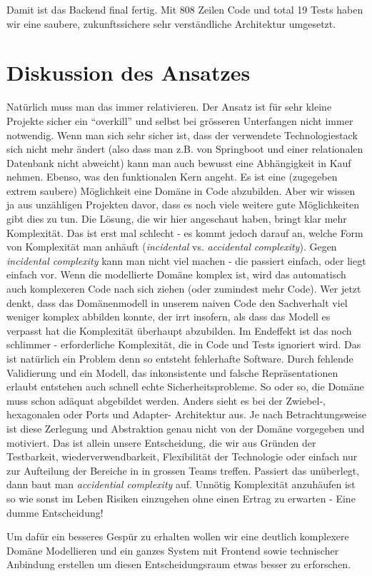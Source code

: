 Damit ist das Backend final fertig. Mit 808 Zeilen Code und total 19 
Tests haben wir eine saubere, zukunftssichere sehr verständliche 
Architektur umgesetzt.

\section{Diskussion des Ansatzes}
Natürlich muss man das immer relativieren. Der Ansatz ist für sehr kleine
Projekte sicher ein ``overkill'' und selbst bei grösseren Unterfangen nicht
immer notwendig. Wenn man sich sehr sicher ist, dass der verwendete
Technologiestack sich nicht mehr ändert (also dass man z.B. von 
Springboot und einer relationalen Datenbank nicht abweicht) kann man auch
bewusst eine Abhängigkeit in Kauf nehmen. Ebenso, was den funktionalen Kern
angeht. Es ist eine (zugegeben extrem saubere) Möglichkeit eine 
Domäne in Code abzubilden. Aber wir wissen ja aus unzähligen Projekten davor,
dass es noch viele weitere gute Möglichkeiten gibt dies zu tun. 
Die Lösung, die wir hier angeschaut haben, bringt klar mehr Komplexität. Das ist
erst mal schlecht - es kommt jedoch darauf an, welche Form von Komplexität man 
anhäuft (\textit{incidental} vs. \textit{accidental} \textit{complexity}).
Gegen \textit{incidental complexity} kann man nicht viel machen - die passiert
einfach, oder liegt einfach vor. Wenn die modellierte Domäne komplex ist, wird
das automatisch auch komplexeren Code nach sich ziehen (oder zumindest mehr 
Code). Wer jetzt denkt, dass
das Domänenmodell in unserem naiven Code den Sachverhalt viel weniger komplex 
abbilden konnte, der irrt insofern, als dass das Modell es verpasst hat die 
Komplexität überhaupt abzubilden. Im Endeffekt ist das noch schlimmer - 
erforderliche Komplexität, die in Code und Tests ignoriert wird. Das ist 
natürlich ein Problem denn so entsteht fehlerhafte Software. Durch fehlende
Validierung und ein Modell, das inkonsistente und falsche Repräsentationen
erlaubt entstehen auch schnell echte Sicherheitsprobleme. So oder so, die
Domäne muss schon adäquat abgebildet werden.
Anders sieht es bei der Zwiebel-, hexagonalen oder Ports und Adapter- 
Architektur aus. Je nach Betrachtungsweise ist diese Zerlegung und Abstraktion
genau nicht von der Domäne vorgegeben und motiviert. Das ist allein unsere
Entscheidung, die wir aus Gründen der Testbarkeit, wiederverwendbarkeit, 
Flexibilität der Technologie oder einfach nur zur Aufteilung der Bereiche in
in grossen Teams treffen. Passiert das unüberlegt, dann baut man 
\textit{accidential complexity} auf. Unnötig Komplexität anzuhäufen ist so wie
sonst im Leben Risiken einzugehen ohne einen Ertrag zu erwarten - Eine
dumme Entscheidung!

Um dafür ein besseres Gespür zu erhalten wollen wir eine deutlich
komplexere Domäne Modellieren und ein ganzes System mit Frontend sowie 
technischer Anbindung erstellen um diesen Entscheidungsraum etwas besser 
zu erforschen.
